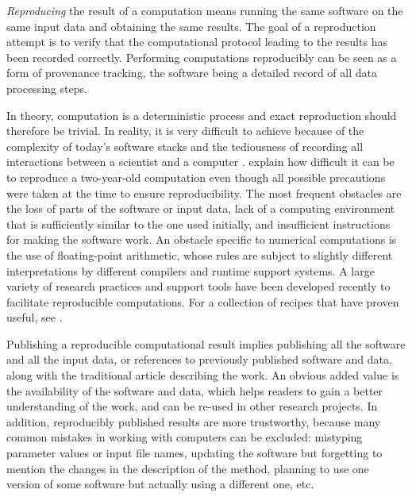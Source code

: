 \documentclass[a4paper,10pt, twocolumn]{article}
\begin{document}
\textit{Reproducing} the result of a computation means running the
same software on the same input data and obtaining the same results.
The goal of a reproduction attempt is to verify that the computational
protocol leading to the results has been recorded correctly.
Performing computations reproducibly can be seen as a form of
provenance tracking, the software being a detailed record of all data
processing steps.

In theory, computation is a deterministic process and exact
reproduction should therefore be trivial. In reality, it is very
difficult to achieve because of the complexity of today's software
stacks and the tediousness of recording all interactions between a
scientist and a computer 
\citep[although a number of recent tools have attempted to automate such recording, e.g.][]{guo:2011, davison:2012, murta:2015}.
\citeauthor{Mesnard:2016} explain
\citep{Mesnard:2016} how difficult it can be to reproduce a two-year-old
computation even though all possible precautions were taken at the
time to ensure reproducibility.  The most frequent obstacles are the
loss of parts of the software or input data, lack of a computing
environment that is sufficiently similar to the one used initially,
and insufficient instructions for making the software work. An
obstacle specific to numerical computations is the use of
floating-point arithmetic, whose rules are subject to slightly
different interpretations by different compilers and runtime support
systems. A large variety of research practices and support tools have
been developed recently to facilitate reproducible computations. For a
collection of recipes that have proven useful, see
\citet{kitzes:2017}.

Publishing a reproducible computational result implies publishing all
the software and all the input data, or references to previously
published software and data, along with the traditional article
describing the work. An obvious added value is the availability of the
software and data, which helps readers to gain a better understanding
of the work, and can be re-used in other research projects. In
addition, reproducibly published results are more trustworthy, because
many common mistakes in working with computers can be excluded:
mistyping parameter values or input file names, updating the software
but forgetting to mention the changes in the description of the
method, planning to use one version of some software but actually
using a different one, etc.
\end{document}
